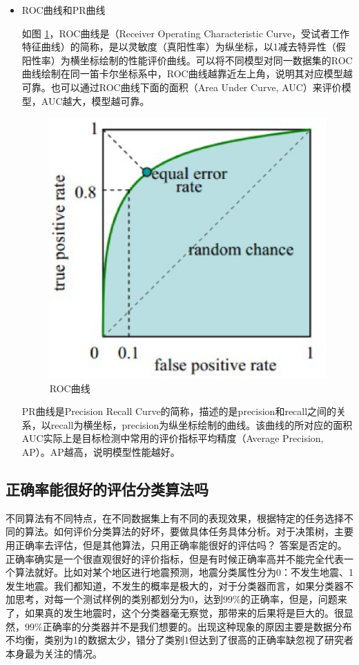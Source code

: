 \begin{itemize}
\item ROC曲线和PR曲线

	如图 \ref{fig:2.3}，ROC曲线是（Receiver Operating Characteristic Curve，受试者工作特征曲线）的简称，是以灵敏度（真阳性率）为纵坐标，以1减去特异性（假阳性率）为横坐标绘制的性能评价曲线。可以将不同模型对同一数据集的ROC曲线绘制在同一笛卡尔坐标系中，ROC曲线越靠近左上角，说明其对应模型越可靠。也可以通过ROC曲线下面的面积（Area Under Curve, AUC）来评价模型，AUC越大，模型越可靠。

 \begin{figure}[h]
   \centering
   \includegraphics[width=.7\textwidth]{eps/2.7.3.eps}
   \caption{ROC曲线}
   \label{fig:2.3}
 \end{figure}

PR曲线是Precision Recall Curve的简称，描述的是precision和recall之间的关系，以recall为横坐标，precision为纵坐标绘制的曲线。该曲线的所对应的面积AUC实际上是目标检测中常用的评价指标平均精度（Average Precision, AP）。AP越高，说明模型性能越好。
\end{itemize}


\subsection{正确率能很好的评估分类算法吗}

不同算法有不同特点，在不同数据集上有不同的表现效果，根据特定的任务选择不同的算法。如何评价分类算法的好坏，要做具体任务具体分析。对于决策树，主要用正确率去评估，但是其他算法，只用正确率能很好的评估吗？
答案是否定的。正确率确实是一个很直观很好的评价指标，但是有时候正确率高并不能完全代表一个算法就好。比如对某个地区进行地震预测，地震分类属性分为0：不发生地震、1发生地震。我们都知道，不发生的概率是极大的，对于分类器而言，如果分类器不加思考，对每一个测试样例的类别都划分为0，达到$99\%$的正确率，但是，问题来了，如果真的发生地震时，这个分类器毫无察觉，那带来的后果将是巨大的。很显然，$99\%$正确率的分类器并不是我们想要的。出现这种现象的原因主要是数据分布不均衡，类别为1的数据太少，错分了类别1但达到了很高的正确率缺忽视了研究者本身最为关注的情况。

